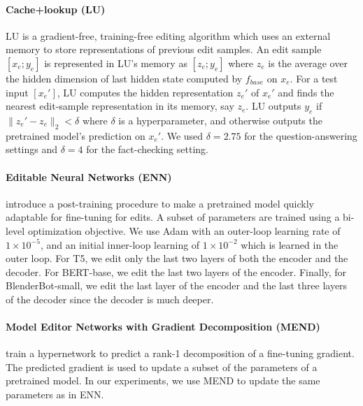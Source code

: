 \documentclass{article}
\begin{document}
\paragraph{Cache+lookup (LU)}
LU \cite{mitchell2021fast} is a gradient-free, training-free editing algorithm which uses an external memory to store representations of previous edit samples. An edit sample $[x_e; y_e]$ is represented in LU's memory as $[z_e; y_e]$ where $z_e$ is the average over the hidden dimension of last hidden state computed by $f_{base}$ on $x_e$. For a test input $[x_e']$, LU computes the hidden representation $z_e'$ of $x_e'$ and finds the nearest edit-sample representation in its memory, say $z_e$. LU outputs $y_e$ if $\|z_e' - z_e\|_2 < \delta$ where $\delta$ is a hyperparameter, and otherwise outputs the pretrained model's prediction on $x_e'$. We used $\delta = 2.75$ for the question-answering settings and $\delta = 4$ for the fact-checking setting.

\paragraph{Editable Neural Networks (ENN)}
\cite{Sinitsin2020Editable} introduce a post-training procedure to make a pretrained model quickly adaptable for fine-tuning for edits. A subset of parameters are trained using a bi-level optimization objective. We use Adam with an outer-loop learning rate of $1\times 10^{-5}$, and an initial inner-loop learning of $1\times 10^{-2}$ which is learned in the outer loop. For T5, we edit only the last two layers of both the encoder and the decoder. For BERT-base, we edit the last two layers of the encoder. Finally, for BlenderBot-small, we edit the last layer of the encoder and the last three layers of the decoder since the decoder is much deeper.

\paragraph{Model Editor Networks with Gradient Decomposition (MEND)}
\cite{mitchell2021fast} train a hypernetwork to predict a rank-1 decomposition of a fine-tuning gradient. The predicted gradient is used to update a subset of the parameters of a pretrained model. In our experiments, we use MEND to update the same parameters as in ENN.



\end{document}
